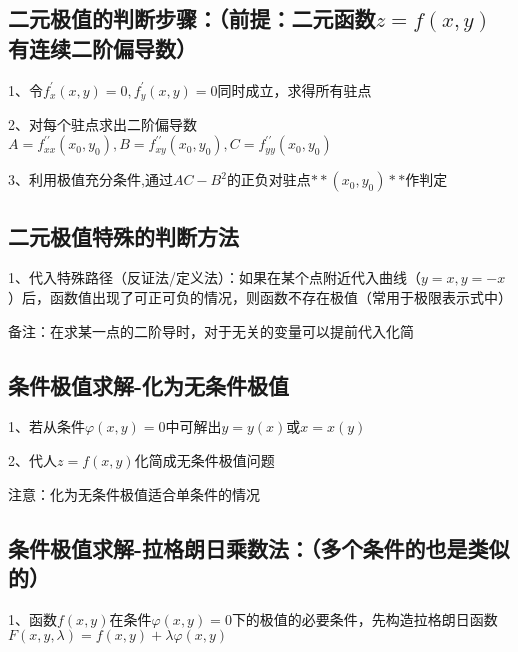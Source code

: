 \subsection{二元极值的判断步骤：（前提：二元函数$ z=f(x, y) $有连续二阶偏导数）}

1、令$ f_{x}^{\prime}(x, y)=0, f_{y}^{\prime}(x, y)=0 $同时成立，求得所有驻点

2、对每个驻点求出二阶偏导数$ A=f_{x x}^{\prime \prime}\left(x_{0}, y_{0}\right), B=f_{x y}^{\prime \prime}\left(x_{0}, y_{0}\right), C=f_{y y}^{\prime \prime}\left(x_{0}, y_{0}\right) $

3、利用极值充分条件,通过$ A C-B^{2} $的正负对驻点$ **\left(x_{0}, y_{0}\right)** $作判定



\subsection{二元极值特殊的判断方法}

1、代入特殊路径（反证法/定义法）：如果在某个点附近代入曲线（$ y=x,y=-x $）后，函数值出现了可正可负的情况，则函数不存在极值（常用于极限表示式中）

备注：在求某一点的二阶导时，对于无关的变量可以提前代入化简



\subsection{条件极值求解-化为无条件极值}

1、若从条件$ \varphi(x, y)=0 $中可解出$ y=y(x) $或$ x=x(y) $

2、代人$ z=f(x, y) $化简成无条件极值问题

注意：化为无条件极值适合单条件的情况



\subsection{条件极值求解-拉格朗日乘数法：（多个条件的也是类似的）}

1、函数$ f(x, y) $在条件$ \varphi(x, y)=0 $下的极值的必要条件，先构造拉格朗日函数$ F(x, y, \lambda)=f(x, y)+\lambda \varphi(x, y) $

